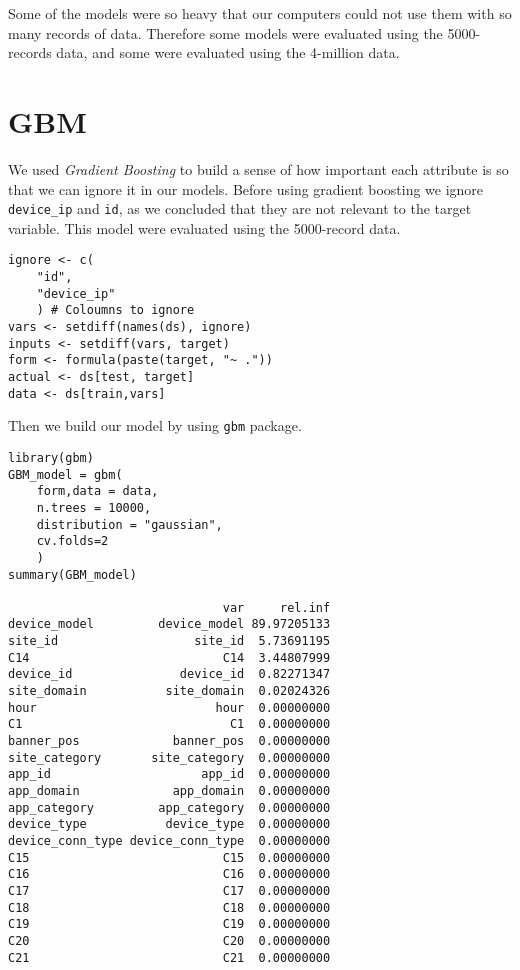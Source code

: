 \documentclass[11pt,a4paper]{article}
\begin{document}
Some of the models were so heavy that our computers could not
use them with so many records of data. Therefore some models were
evaluated using the 5000-records data, and some were
evaluated using the 4-million data.

\section{GBM}
\label{sec-2}
We used \emph{Gradient Boosting} to build a sense of how important
each attribute is so that we can ignore it in our models. Before using gradient
boosting we ignore \texttt{device\_ip} and \texttt{id}, as we concluded that they
are not relevant to the target variable. This model were evaluated
using the 5000-record data.

\begin{verbatim}
ignore <- c(
    "id",
    "device_ip"
    ) # Coloumns to ignore
vars <- setdiff(names(ds), ignore)
inputs <- setdiff(vars, target)
form <- formula(paste(target, "~ ."))
actual <- ds[test, target]
data <- ds[train,vars]
\end{verbatim}

Then we build our model by using \texttt{gbm} package.

\begin{verbatim}
library(gbm)
GBM_model = gbm(
    form,data = data,
    n.trees = 10000, 
    distribution = "gaussian",
    cv.folds=2
    )
summary(GBM_model)

                              var     rel.inf
device_model         device_model 89.97205133
site_id                   site_id  5.73691195
C14                           C14  3.44807999
device_id               device_id  0.82271347
site_domain           site_domain  0.02024326
hour                         hour  0.00000000
C1                             C1  0.00000000
banner_pos             banner_pos  0.00000000
site_category       site_category  0.00000000
app_id                     app_id  0.00000000
app_domain             app_domain  0.00000000
app_category         app_category  0.00000000
device_type           device_type  0.00000000
device_conn_type device_conn_type  0.00000000
C15                           C15  0.00000000
C16                           C16  0.00000000
C17                           C17  0.00000000
C18                           C18  0.00000000
C19                           C19  0.00000000
C20                           C20  0.00000000
C21                           C21  0.00000000
\end{verbatim}
\end{document}

